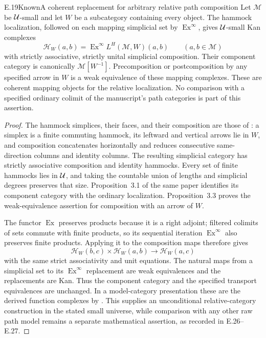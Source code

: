 \begin{claim}{E.19}{Known}{A coherent replacement for arbitrary relative path composition}
Let $\mathcal M$ be $\mathcal U$-small and let $W$ be a subcategory containing every object. The hammock localization, followed on each mapping simplicial set by $\operatorname{Ex}^{\infty}$, gives $\mathcal U$-small Kan complexes
\[
 \mathcal H_W(a,b)=\operatorname{Ex}^{\infty}
          L^H(\mathcal M,W)(a,b)
 \qquad(a,b\in\mathcal M)
\]
with strictly associative, strictly unital simplicial composition. Their component category is canonically $\mathcal M[W^{-1}]$. Precomposition or postcomposition by any specified arrow in $W$ is a weak equivalence of these mapping complexes. These are coherent mapping objects for the relative localization. No comparison with a specified ordinary colimit of the manuscript's path categories is part of this assertion.
\end{claim}
\begin{proof}
The hammock simplices, their faces, and their composition are those of \citet[Definition~2.1]{DwyerKan1980Calculating}: a simplex is a finite commuting hammock, its leftward and vertical arrows lie in $W$, and composition concatenates horizontally and reduces consecutive same-direction columns and identity columns. The resulting simplicial category has strictly associative composition and identity hammocks. Every set of finite hammocks lies in $\mathcal U$, and taking the countable union of lengths and simplicial degrees preserves that size. Proposition~3.1 of the same paper identifies its component category with the ordinary localization. Proposition~3.3 proves the weak-equivalence assertion for composition with an arrow of $W$.

The functor $\operatorname{Ex}$ preserves products because it is a right adjoint; filtered colimits of sets commute with finite products, so its sequential iteration $\operatorname{Ex}^{\infty}$ also preserves finite products. Applying it to the composition maps therefore gives
\[
 \mathcal H_W(b,c)\times\mathcal H_W(a,b)
       \longrightarrow\mathcal H_W(a,c)
\]
with the same strict associativity and unit equations. The natural maps from a simplicial set to its $\operatorname{Ex}^{\infty}$ replacement are weak equivalences and the replacements are Kan. Thus the component category and the specified transport equivalences are unchanged. In a model-category presentation these are the derived function complexes by \citet[Proposition~4.4 and Corollary~4.7]{DwyerKan1980Function}. This supplies an unconditional relative-category construction in the stated small universe, while comparison with any other raw path model remains a separate mathematical assertion, as recorded in E.26--E.27.
\end{proof}
